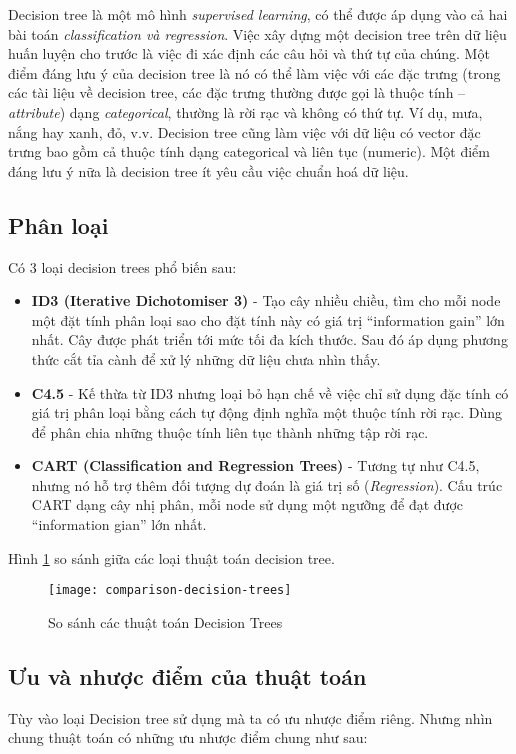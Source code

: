 \documentclass[../main-report.tex]{subfiles}
\begin{document}
Decision tree là một mô hình \textit{supervised learning}, có thể được áp dụng vào cả hai bài toán \textit{classification và regression}. Việc xây dựng một decision tree trên dữ liệu huấn luyện cho trước là việc đi xác định các câu hỏi và thứ tự của chúng. Một điểm đáng lưu ý của decision tree là nó có thể làm việc với các đặc trưng (trong các tài liệu về decision tree, các đặc trưng thường được gọi là thuộc tính – \textit{attribute}) dạng \textit{categorical}, thường là rời rạc và không có thứ tự. Ví dụ, mưa, nắng hay xanh, đỏ, v.v. Decision tree cũng làm việc với dữ liệu có vector đặc trưng bao gồm cả thuộc tính dạng categorical và liên tục (numeric). Một điểm đáng lưu ý nữa là decision tree ít yêu cầu việc chuẩn hoá dữ liệu.

\subsection{Phân loại}
Có 3 loại decision trees phổ biến sau:

\begin{itemize}
\item \textbf{ID3 (Iterative Dichotomiser 3)} - Tạo cây nhiều chiều, tìm cho mỗi node một đặt tính phân loại sao cho đặt tính này có giá trị ``information gain'' lớn nhất. Cây được phát triển tới mức tối đa kích thước. Sau đó áp dụng phương thức cắt tỉa cành để xử lý những dữ liệu chưa nhìn thấy.
\item \textbf{C4.5} - Kế thừa từ  ID3 nhưng loại bỏ hạn chế về việc chỉ sử dụng đặc tính có giá trị phân loại bằng cách tự động định nghĩa một thuộc tính rời rạc. Dùng để phân chia những thuộc tính liên tục thành những tập rời rạc.
\item \textbf{CART (Classification and Regression Trees)} - Tương tự như C4.5, nhưng nó hỗ trợ thêm đối tượng dự đoán là giá trị số (\textit{Regression}). Cấu trúc CART dạng cây nhị phân, mỗi node sử dụng một ngưỡng để đạt được ``information gian'' lớn nhất.
\end{itemize}

Hình \ref{fig:decision_tree_type_comparison} so sánh giữa các loại thuật toán decision tree.

\begin{figure}[ht!]
\centering\texttt{[image: comparison-decision-trees]}
\caption{So sánh các thuật toán Decision Trees}
\label{fig:decision_tree_type_comparison}
\end{figure}

\subsection{Ưu và nhược điểm của thuật toán}
Tùy vào loại Decision tree sử dụng mà ta có ưu nhược điểm riêng. Nhưng nhìn chung thuật toán có những ưu nhược điểm chung như sau:
\end{document}
